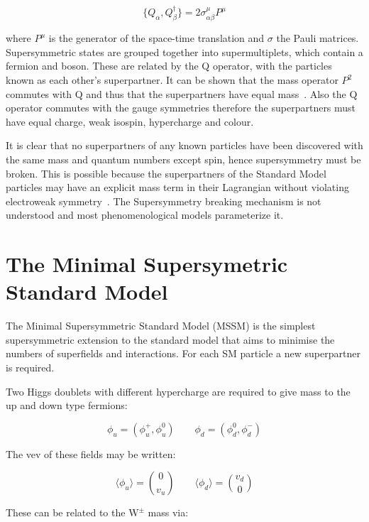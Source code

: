 \begin{equation}
	\{ Q_{\alpha}, Q_{\beta}^{\dagger} \} = 2\sigma^{\mu}_{\alpha \beta}P^{\mu}
\end{equation}

where $P^{\mu}$ is the generator of the space-time translation and $\sigma$ the Pauli matrices. Supersymmetric states are grouped together into supermultiplets, which contain a fermion and boson. These are related by the Q operator, with the particles known as each other's superpartner. It can be shown that the mass operator $P^{2}$ commutes with Q and thus that the superpartners have equal mass~\cite{citeulike:681336}. Also the Q operator commutes with the gauge symmetries therefore the superpartners must have equal charge, weak isospin, hypercharge and colour. 

It is clear that no superpartners of any known particles have been discovered with the same mass and quantum numbers except spin, hence supersymmetry must be broken. This is possible because the superpartners of the Standard Model particles may have an explicit mass term in their Lagrangian without violating electroweak symmetry~\cite{citeulike:681336}. The Supersymmetry breaking mechanism is not understood and most phenomenological models parameterize it.

\section{The Minimal Supersymetric Standard Model \label{sec:mssm}}
The Minimal Supersymmetric Standard Model (MSSM) is the simplest supersymmetric extension to the standard model that aims to minimise the numbers of superfields and interactions. For each SM particle a new superpartner is required.

Two Higgs doublets with different hypercharge are required to give mass to the up and down type fermions: 

\begin{equation}
	\phi_{u} = (\phi_{u}^{+}, \phi_{u}^{0}) \qquad \phi_{d} = (\phi_{d}^{0}, \phi_{d}^{-}) 
\end{equation}

The vev of these fields may be written:

\begin{equation}
	\langle \phi_{u}\rangle = \binom{0}{v_u} \qquad \langle \phi_{d}\rangle = \binom{v_d}{0}
\end{equation}

These can be related to the $\mathrm{W^{\pm}}$ mass via:

